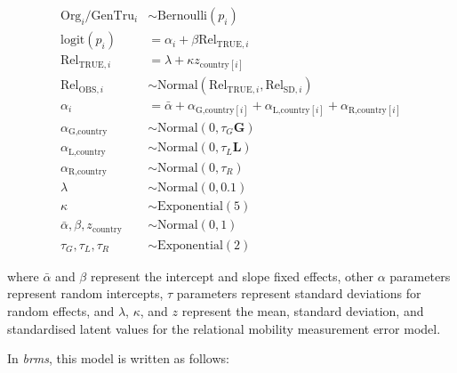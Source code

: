 \documentclass[
  man,floatsintext]{apa6}
\begin{document}
\[
\begin{aligned}
\text{Org}_{i}/\text{GenTru}_{i} &\sim \text{Bernoulli}(p_{i}) \\
\text{logit}(p_{i}) &= \alpha_{i} + \beta\text{Rel}_{\text{TRUE},i} \\
\text{Rel}_{\text{TRUE},i} &= \lambda + \kappa z_{\text{country}[i]} \\
\text{Rel}_{\text{OBS},i} &\sim \text{Normal}(\text{Rel}_{\text{TRUE},i}, \text{Rel}_{\text{SD},i}) \\
\alpha_{i} &= \bar{\alpha} + \alpha_{\text{G,country}[i]} + \alpha_{\text{L,country}[i]} + \alpha_{\text{R,country}[i]} \\
\alpha_{\text{G,country}} &\sim \text{Normal}(0, \tau_{G} \textbf{G}) \\
\alpha_{\text{L,country}} &\sim \text{Normal}(0, \tau_{L} \textbf{L}) \\
\alpha_{\text{R,country}} &\sim \text{Normal}(0, \tau_{R}) \\
\lambda &\sim \text{Normal}(0, 0.1) \\
\kappa &\sim \text{Exponential}(5) \\
\bar{\alpha},\beta,z_{\text{country}} &\sim \text{Normal}(0, 1)\\
\tau_{G},\tau_{L},\tau_{R} &\sim \text{Exponential}(2)
\end{aligned}
\]

where \(\bar{\alpha}\) and \(\beta\) represent the intercept and slope fixed effects, other \(\alpha\) parameters represent random intercepts, \(\tau\) parameters represent standard deviations for random effects, and \(\lambda\), \(\kappa\), and \(z\) represent the mean, standard deviation, and standardised latent values for the relational mobility measurement error model.

In \emph{brms}, this model is written as follows:
\end{document}
